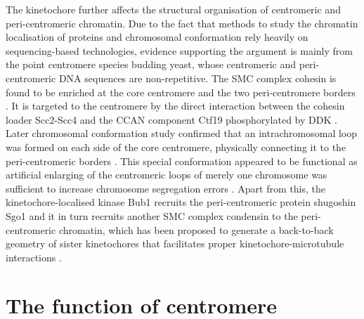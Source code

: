 The kinetochore further affects the structural organisation of centromeric and peri-centromeric chromatin. Due to the fact that methods to study the chromatin localisation of proteins and chromosomal conformation rely heavily on sequencing-based technologies, evidence supporting the argument is mainly from the point centromere species budding yeast, whose centromeric and peri-centromeric DNA sequences are non-repetitive. The SMC complex cohesin is found to be enriched at the core centromere and the two peri-centromere borders \citep{Eckert2007TheTension, Fernius2009EstablishmentCsm3, Fernius2013Cohesin-DependentEstablishment, Glynn2004Genome-WideCerevisiae, Weber2004TheBinding}. It is targeted to the centromere by the direct interaction between the cohesin loader Scc2-Scc4 and the CCAN component Ctf19 phosphorylated by DDK \citep{Hinshaw2015StructuralLoading, Hinshaw2017TheComplex}. Later chromosomal conformation study confirmed that an intrachromosomal loop was formed on each side of the core centromere, physically connecting it to the peri-centromeric borders \citep{Paldi2020ConvergentPericentromeres}. This special conformation appeared to be functional as artificial enlarging of the centromeric loops of merely one chromosome was sufficient to increase chromosome segregation errors \citep{Paldi2020ConvergentPericentromeres}. Apart from this, the kinetochore-localised kinase Bub1 recruits the peri-centromeric protein shugoshin Sgo1 and it in turn recruits another SMC complex condensin to the peri-centromeric chromatin, which has been proposed to generate a back-to-back geometry of sister kinetochores that facilitates proper kinetochore-microtubule interactions \citep{Indjeian2007, Verzijlbergen2014}. 


\section{The function of centromere}

